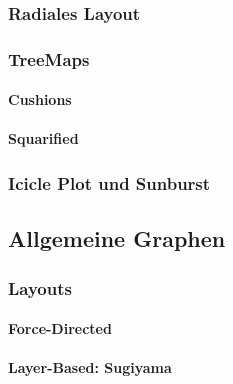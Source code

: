             \subsubsection{Radiales Layout} %

            \subsubsection{TreeMaps} %

                \paragraph{Cushions} %

                \paragraph{Squarified} %

            \subsubsection{Icicle Plot und Sunburst} %

        \subsection{Allgemeine Graphen} %

            \subsubsection{Layouts} %

                \paragraph{Force-Directed} %

                \paragraph{Layer-Based: Sugiyama} %

